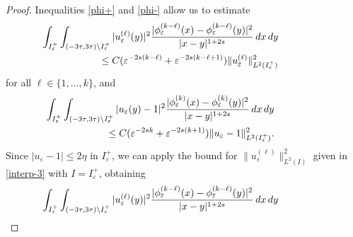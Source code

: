 \documentclass{article}
\newcommand{\e}{\varepsilon}
\begin{document}
\begin{proof}
Inequalities  
\eqref{phi+} and \eqref{phi-} allow us to estimate 
\begin{eqnarray*}
&&\hspace{-2cm}\int_{I_\e^+}\int_{(-3\tau,3\tau)\setminus I_\e^+} |u_\e^{(\ell)}(y)|^2\frac{|\phi_\e^{(k-\ell)}(x)-\phi_\e^{(k-\ell)}(y)|^2}{|x-y|^{1+2s}}\, dx\, dy
\nonumber\\
&&\leq C(\e^{-2s(k-\ell)} 
+\e^{-2s(k-\ell+1)})\|u_\e^{(\ell)}\|^2_{L^2(I_\e^+)} %
\end{eqnarray*}
for all $\ell\in\{1,\dots, k\}$, and 
\begin{eqnarray}\label{g0}
&&\hspace{-2cm}\int_{I_\e^+}\int_{(-3\tau,3\tau)\setminus I_\e^+} |u_\e(y)-1|^2\frac{|\phi_\e^{(k)}(x)-\phi_\e^{(k)}(y)|^2}{|x-y|^{1+2s}}\, dx\, dy
\nonumber\\
&&\leq C(\e^{-2sk} 
+\e^{-2s(k+1)})\|u_\e-1\|^2_{L^2(I_\e^+)}.
\end{eqnarray} 
Since $|u_\e-1|\leq 2\eta$ in $I_\e^+$, 
we can apply the bound for $\|u_\e^{(\ell)}\|^2_{L^2(I)}$ given in \eqref{interp-3} with $I=I_\e^+$, obtaining 
\begin{eqnarray}\label{rf}
&&\hspace{-2cm}\int_{I_\e^+}\int_{(-3\tau,3\tau)\setminus I_\e^+} |u_\e^{(\ell)}(y)|^2\frac{|\phi_\e^{(k-\ell)}(x)-\phi_\e^{(k-\ell)}(y)|^2}{|x-y|^{1+2s}}\, dx\, dy
\nonumber\\

\end{eqnarray}
\end{proof}
\end{document}

